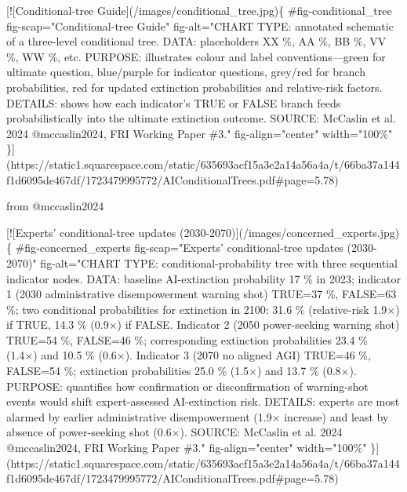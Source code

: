 \documentclass[
  11pt,
  letterpaper,
]{book}
\newenvironment{Shaded}{\begin{snugshade}}{\end{snugshade}}
\newcommand{\CommentTok}[1]{\textcolor[rgb]{0.37,0.37,0.37}{#1}}
\newcommand{\NormalTok}[1]{\textcolor[rgb]{0.00,0.23,0.31}{#1}}
\newcommand{\OtherTok}[1]{\textcolor[rgb]{0.00,0.23,0.31}{#1}}
\begin{document}
\begin{Shaded}
\begin{Highlighting}[]
\CommentTok{[}\OtherTok{![Conditional{-}tree Guide}\CommentTok{](/images/conditional\_tree.jpg)}\NormalTok{\{}
\NormalTok{  \#fig{-}conditional\_tree}
\NormalTok{  fig{-}scap="Conditional{-}tree Guide"}
\NormalTok{  fig{-}alt="CHART TYPE: annotated schematic of a three{-}level conditional tree. DATA: placeholders XX \%, AA \%, BB \%, VV \%, WW \%, etc. PURPOSE: illustrates colour and label conventions—green for ultimate question, blue/purple for indicator questions, grey/red for branch probabilities, red for updated extinction probabilities and relative{-}risk factors. DETAILS: shows how each indicator’s TRUE or FALSE branch feeds probabilistically into the ultimate extinction outcome. SOURCE: McCaslin et al. 2024 @mccaslin2024, FRI Working Paper \#3."}
\NormalTok{  fig{-}align="center"}
\NormalTok{    width="100\%"}
\NormalTok{\}](https://static1.squarespace.com/static/635693acf15a3e2a14a56a4a/t/66ba37a144f1d6095de467df/1723479995772/AIConditionalTrees.pdf\#page=5.78)}






\NormalTok{from @mccaslin2024}

\CommentTok{[}\OtherTok{![Experts’ conditional{-}tree updates (2030{-}2070)}\CommentTok{](/images/concerned\_experts.jpg)}\NormalTok{\{}
\NormalTok{    \#fig{-}concerned\_experts}
\NormalTok{    fig{-}scap="Experts’ conditional{-}tree updates (2030{-}2070)"}
\NormalTok{    fig{-}alt="CHART TYPE: conditional{-}probability tree with three sequential indicator nodes. DATA: baseline AI{-}extinction probability 17 \% in 2023; indicator 1 (2030 administrative disempowerment warning shot) TRUE=37 \%, FALSE=63 \%; two conditional probabilities for extinction in 2100: 31.6 \% (relative{-}risk 1.9×) if TRUE, 14.3 \% (0.9×) if FALSE. Indicator 2 (2050 power{-}seeking warning shot) TRUE=54 \%, FALSE=46 \%; corresponding extinction probabilities 23.4 \% (1.4×) and 10.5 \% (0.6×). Indicator 3 (2070 no aligned AGI) TRUE=46 \%, FALSE=54 \%; extinction probabilities 25.0 \% (1.5×) and 13.7 \% (0.8×). PURPOSE: quantifies how confirmation or disconfirmation of warning{-}shot events would shift expert{-}assessed AI{-}extinction risk. DETAILS: experts are most alarmed by earlier administrative disempowerment (1.9× increase) and least by absence of power{-}seeking shot (0.6×). SOURCE: McCaslin et al. 2024 @mccaslin2024, FRI Working Paper \#3."}
\NormalTok{    fig{-}align="center"}
\NormalTok{    width="100\%"}
\NormalTok{\}](https://static1.squarespace.com/static/635693acf15a3e2a14a56a4a/t/66ba37a144f1d6095de467df/1723479995772/AIConditionalTrees.pdf\#page=5.78)}




\end{Highlighting}
\end{Shaded}
\end{document}
